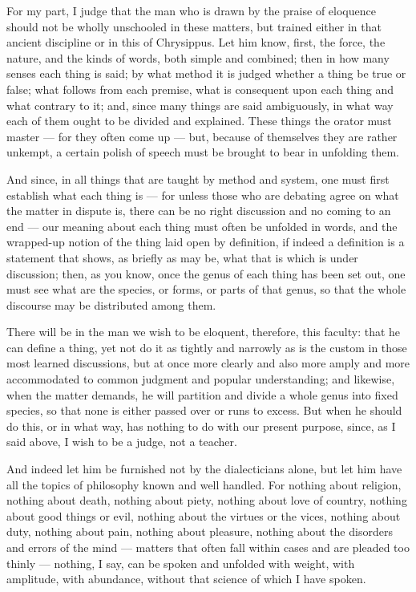  For my part, I judge that the man who is drawn by the praise of eloquence should not be wholly unschooled in these matters, but trained either in that ancient discipline or in this of Chrysippus. Let him know, first, the force, the nature, and the kinds of words, both simple and combined; then in how many senses each thing is said; by what method it is judged whether a thing be true or false; what follows from each premise, what is consequent upon each thing and what contrary to it; and, since many things are said ambiguously, in what way each of them ought to be divided and explained. These things the orator must master — for they often come up — but, because of themselves they are rather unkempt, a certain polish of speech must be brought to bear in unfolding them.

 And since, in all things that are taught by method and system, one must first establish what each thing is — for unless those who are debating agree on what the matter in dispute is, there can be no right discussion and no coming to an end — our meaning about each thing must often be unfolded in words, and the wrapped-up notion of the thing laid open by definition, if indeed a definition is a statement that shows, as briefly as may be, what that is which is under discussion; then, as you know, once the genus of each thing has been set out, one must see what are the species, or forms, or parts of that genus, so that the whole discourse may be distributed among them.

 There will be in the man we wish to be eloquent, therefore, this faculty: that he can define a thing, yet not do it as tightly and narrowly as is the custom in those most learned discussions, but at once more clearly and also more amply and more accommodated to common judgment and popular understanding; and likewise, when the matter demands, he will partition and divide a whole genus into fixed species, so that none is either passed over or runs to excess. But when he should do this, or in what way, has nothing to do with our present purpose, since, as I said above, I wish to be a judge, not a teacher.

 And indeed let him be furnished not by the dialecticians alone, but let him have all the topics of philosophy known and well handled. For nothing about religion, nothing about death, nothing about piety, nothing about love of country, nothing about good things or evil, nothing about the virtues or the vices, nothing about duty, nothing about pain, nothing about pleasure, nothing about the disorders and errors of the mind — matters that often fall within cases and are pleaded too thinly — nothing, I say, can be spoken and unfolded with weight, with amplitude, with abundance, without that science of which I have spoken.

